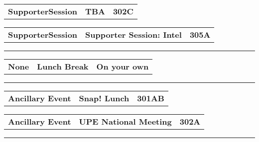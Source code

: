 \begin{longtable}[l]{@{}p{1in}@{}p{3in}@{}r}
    {\sffamily\large\textbf{SupporterSession}} & 
    {\sffamily\large\textbf{TBA}} & 
    {\sffamily\large\textbf{302C}} \\
\end{longtable}    
\begin{longtable}[l]{@{}p{1in}@{}p{3in}@{}r}
    {\sffamily\large\textbf{SupporterSession}} & 
    {\sffamily\large\textbf{Supporter Session: Intel}} & 
    {\sffamily\large\textbf{305A}} \\
\end{longtable}    
\vspace{0.5em}
\noindent\rule{5in}{0.02cm}
\vspace{0.5em}
\noindent
{}
\begin{longtable}[l]{@{}p{1in}@{}p{3in}@{}r}
    {\sffamily\large\textbf{None}} & 
    {\sffamily\large\textbf{Lunch Break}} & 
    {\sffamily\large\textbf{On your own}} \\
\end{longtable}    
\vspace{0.5em}
\noindent\rule{5in}{0.02cm}
\vspace{0.5em}
\noindent
{}
\begin{longtable}[l]{@{}p{1in}@{}p{3in}@{}r}
    {\sffamily\large\textbf{Ancillary Event}} & 
    {\sffamily\large\textbf{Snap! Lunch}} & 
    {\sffamily\large\textbf{301AB}} \\
\end{longtable}    
\begin{longtable}[l]{@{}p{1in}@{}p{3in}@{}r}
    {\sffamily\large\textbf{Ancillary Event}} & 
    {\sffamily\large\textbf{UPE National Meeting}} & 
    {\sffamily\large\textbf{302A}} \\
\end{longtable}    
\vspace{0.5em}
\noindent\rule{5in}{0.02cm}
\vspace{0.5em}
\noindent
{}
